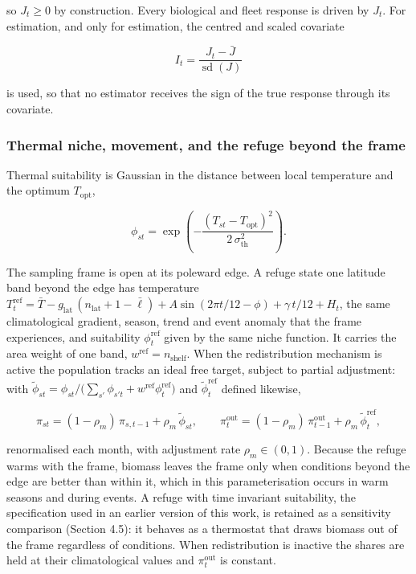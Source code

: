 \documentclass[
  11pt,
  a4paper,
]{article}
\begin{document}
\noindent so \(J_t \ge 0\) by construction. Every biological and fleet response is
driven by \(J_t\). For estimation, and only for estimation, the centred
and scaled covariate

\begin{equation}
I_t = \frac{J_t - \bar{J}}{\operatorname{sd}(J)}
\end{equation}

\noindent is used, so that no estimator receives the sign of the true response
through its covariate.

\hypertarget{thermal-niche-movement-and-the-refuge-beyond-the-frame}{%
\subsubsection{Thermal niche, movement, and the refuge beyond the
frame}\label{thermal-niche-movement-and-the-refuge-beyond-the-frame}}

Thermal suitability is Gaussian in the distance between local
temperature and the optimum \(T_{\text{opt}}\),

\begin{equation}
\phi_{st} = \exp\!\left(-\frac{(T_{st} - T_{\text{opt}})^2}{2\,\sigma_{\text{th}}^2}\right).
\end{equation}

\noindent The sampling frame is open at its poleward edge. A refuge state one
latitude band beyond the edge has temperature
\(T^{\text{ref}}_t = \bar{T} - g_{\text{lat}}\,(n_{\text{lat}} + 1 - \bar{\ell}) + A\sin(2\pi t/12 - \phi) + \gamma\,t/12 + H_t\),
the same climatological gradient, season, trend and event anomaly that
the frame experiences, and suitability \(\phi^{\text{ref}}_t\) given by
the same niche function. It carries the area weight of one band,
\(w^{\text{ref}} = n_{\text{shelf}}\). When the redistribution mechanism
is active the population tracks an ideal free target, subject to partial
adjustment: with
\(\tilde{\phi}_{st} = \phi_{st} / \big(\sum_{s'} \phi_{s't} + w^{\text{ref}}\phi^{\text{ref}}_t\big)\)
and \(\tilde{\phi}^{\text{ref}}_t\) defined likewise,

\begin{equation}
\pi_{st} = (1 - \rho_m)\,\pi_{s,t-1} + \rho_m\,\tilde{\phi}_{st}, \qquad \pi^{\text{out}}_t = (1 - \rho_m)\,\pi^{\text{out}}_{t-1} + \rho_m\,\tilde{\phi}^{\text{ref}}_t,
\end{equation}

\noindent renormalised each month, with adjustment rate \(\rho_m \in (0,1)\).
Because the refuge warms with the frame, biomass leaves the frame only
when conditions beyond the edge are better than within it, which in this
parameterisation occurs in warm seasons and during events. A refuge with
time invariant suitability, the specification used in an earlier version
of this work, is retained as a sensitivity comparison (Section 4.5): it
behaves as a thermostat that draws biomass out of the frame regardless
of conditions. When redistribution is inactive the shares are held at
their climatological values and \(\pi^{\text{out}}_t\) is constant.
\end{document}
